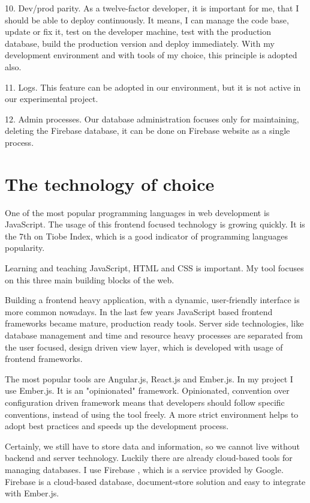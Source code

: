 \documentclass[11pt, a4paper, oneside, openright, medskipamount]{report}
\begin{document}
10. Dev/prod parity. As a twelve-factor developer, it is important for me, that I should be able to deploy continuously. It means, I can manage the code base, update or fix it, test on the developer machine, test with the production database, build the production version and deploy immediately. With my development environment and with tools of my choice, this principle is adopted also.

11. Logs. This feature can be adopted in our environment, but it is not active in our experimental project.

12. Admin processes. Our database administration focuses only for maintaining, deleting the Firebase database, it can be done on Firebase website as a single process.

\section{The technology of choice}

One of the most popular programming languages in web development is JavaScript. The usage of this frontend focused technology is growing quickly.  It is the 7th on Tiobe Index, which is a good indicator of programming languages popularity. \cite{tiobe}

Learning and teaching JavaScript, HTML and CSS is important. My tool focuses on this three main building blocks of the web.

Building a frontend heavy application, with a dynamic, user-friendly interface is more common nowadays. In the last few years JavaScript based frontend frameworks became mature, production ready tools. Server side technologies, like database management and time and resource heavy processes are separated from the user focused, design driven view layer, which is developed with usage of frontend frameworks.

The most popular tools are Angular.js, React.js and Ember.js. In my project I use Ember.js. It is an "opinionated" framework. Opinionated, convention over configuration driven framework means that developers should follow specific conventions, instead of using the tool freely. A more strict environment helps to adopt best practices and speeds up the development process.

Certainly, we still have to store data and information, so we cannot live without backend and server technology. Luckily there are already cloud-based tools for managing databases. I use Firebase \cite{firebase}, which is a service provided by Google. Firebase is a cloud-based database, document-store solution and easy to integrate with Ember.js.
\end{document}
